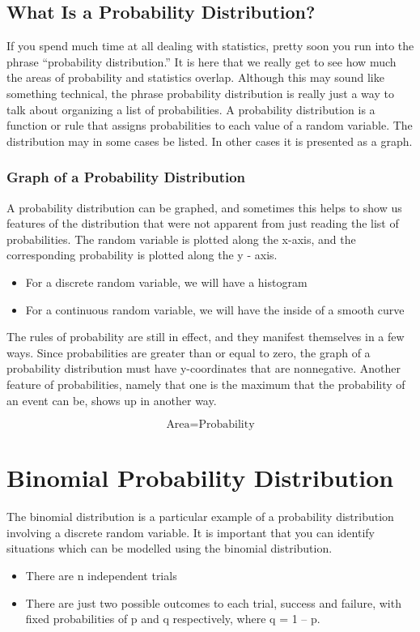 \documentclass[12pt]{article}
\begin{document}
\subsection{What Is a Probability Distribution?}
If you spend much time at all dealing with statistics, pretty soon you run into the phrase “probability distribution.” It is here that we really get to see how much the areas of probability and statistics overlap. Although this may sound like something technical, the phrase probability distribution is really just a way to talk about organizing a list of probabilities. A probability distribution is a function or rule that assigns probabilities to each value of a random variable. The distribution may in some cases be listed. In other cases it is presented as a graph.


\subsubsection{Graph of a Probability Distribution}

A probability distribution can be graphed, and sometimes this helps to show us features of the distribution that were not apparent from just reading the list of probabilities. The random variable is plotted along the x-axis, and the corresponding probability is plotted along the y - axis.

\begin{itemize}
\item For a discrete random variable, we will have a histogram
\item For a continuous random variable, we will have the inside of a smooth curve
\end{itemize}

The rules of probability are still in effect, and they manifest themselves in a few ways. Since probabilities are greater than or equal to zero, the graph of a probability distribution must have y-coordinates that are nonnegative. Another feature of probabilities, namely that one is the maximum that the probability of an event can be, shows up in another way.

\[ \mbox{Area} = \mbox{Probability} \]



\newpage
\section{Binomial Probability Distribution}
The binomial distribution is a particular example of a probability distribution involving a discrete random variable. 
It is important that you can identify situations which can be modelled using the binomial distribution. 
\begin{itemize}
\item There are n independent trials 
\item There are just two possible outcomes to each trial, success and failure, with fixed probabilities of p and q respectively, where q = 1 – p. 
\end{itemize}
\end{document}
